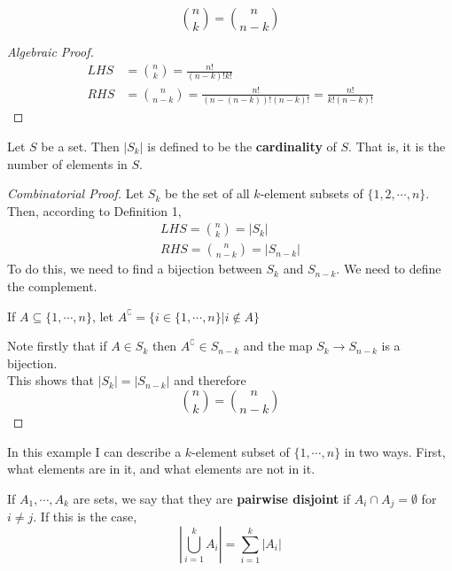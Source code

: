 \documentclass[english, 11pt]{article}
\begin{document}
  \begin{thrm}
    \[ {n \choose k} = {n \choose n - k} \]
  \end{thrm}

  \begin{proof}[Algebraic Proof]
    \begin{align*}
      LHS & = {n \choose k} = \frac{n!}{(n-k)!k!} \\
      RHS & = {n \choose n - k} = \frac{n!}{(n-(n-k))!(n-k)!} = \frac{n!}{k!(n-k)!}
    \end{align*}
  \end{proof}

  \begin{defn}
    Let $S$ be a set. Then $|S_k|$ is defined to be the \textbf{cardinality} of $S$. That is, it is the number of elements in $S$.
  \end{defn}

  \begin{proof}[Combinatorial Proof]
    Let $S_k$ be the set of all $k$-element subsets of $\{1,2,\cdots,n\}$. Then, according to Definition 1,
    \begin{align*}
      LHS = {n \choose k} = |S_k| \\
      RHS = {n \choose n - k} = |S_{n-k}|
    \end{align*}
    To do this, we need to find a bijection between $S_k$ and $S_{n-k}$. We need to define the complement.

    \begin{defn}
      If $A \subseteq \{ 1, \cdots, n \}$, let $A^{\complement} = \{ i \in \{ 1, \cdots, n \} | i \not \in A \}$
    \end{defn}

    Note firstly that if $A \in S_k$ then $A ^{\complement} \in S_{n-k}$ and the map $S_k \rightarrow S_{n-k}$ is a bijection. \\
    This shows that $|S_k| = |S_{n-k}|$ and therefore
    $${n \choose k} = {n \choose n -k}$$
  \end{proof}

  In this example I can describe a $k$-element subset of $\{1,\cdots,n\}$ in two ways. First, what elements are in it, and what elements are not in it.

  \begin{defn}
    If $A_1, \cdots, A_k$ are sets, we say that they are \textbf{pairwise disjoint} if $A_i \cap A_j = \emptyset$ for $i \not = j$. If this is the case,
    \[ \left|\bigcup_{i=1}^k A_i\right| = \sum_{i=1}^k |A_i| \]
  \end{defn}
\end{document}
